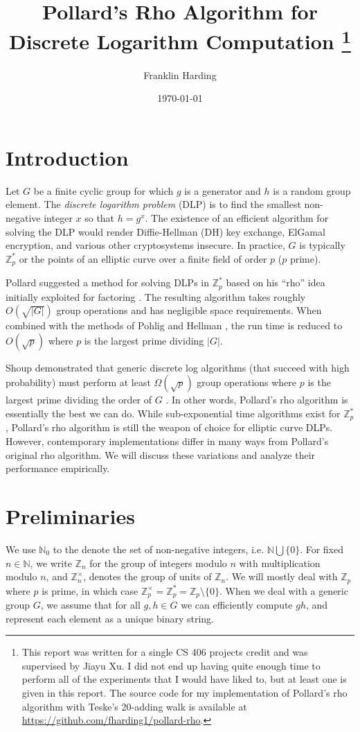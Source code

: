 \documentclass{article}
\title{Pollard's Rho Algorithm for Discrete Logarithm Computation \thanks{This report was written for a single CS 406 projects credit and was supervised by Jiayu Xu. I did not end up having quite enough time to perform all of the experiments that I would have liked to, but at least one is given in this report. The source code for my implementation of Pollard's rho algorithm with Teske's 20-adding walk is available at \href{https://github.com/fharding1/pollard-rho}{https://github.com/fharding1/pollard-rho}.}}
\author{Franklin Harding}
\date{\today}
\newcommand{\ZZ}{\mathbb{Z}}
\newcommand{\NN}{\mathbb{N}}
\begin{document}
\maketitle

\section{Introduction}

Let $G$ be a finite cyclic group for which $g$ is a generator and $h$ is a random group element. The \textit{discrete logarithm problem} (DLP) is to find the smallest non-negative integer $x$ so that $h = g^x$. The existence of an efficient algorithm for solving the DLP would render Diffie-Hellman (DH) key exchange, ElGamal encryption, and various other cryptosystems insecure. In practice, $G$ is typically $\ZZ_p^*$ or the points of an elliptic curve over a finite field of order $p$ ($p$ prime).

Pollard suggested a method for solving DLPs in $\ZZ_p^*$ \cite{Pollard1978} based on his ``rho'' idea initially exploited for factoring \cite{Pollard1975}. The resulting algorithm takes roughly $O(\sqrt{|G|})$ group operations and has negligible space requirements. When combined with the methods of Pohlig and Hellman \cite{Pohlig78}, the run time is reduced to $O(\sqrt{p})$ where $p$ is the largest prime dividing $|G|$.

Shoup demonstrated that generic discrete log algorithms (that succeed with high probability) must perform at least $\Omega(\sqrt{p})$ group operations where $p$ is the largest prime dividing the order of $G$ \cite{Shoup1997}. In other words, Pollard's rho algorithm is essentially the best we can do. While sub-exponential time algorithms exist for $\ZZ_p^*$, Pollard's rho algorithm is still the weapon of choice for elliptic curve DLPs. However, contemporary implementations differ in many ways from Pollard's original rho algorithm. We will discuss these variations and analyze their performance empirically.

\section{Preliminaries}

We use $\NN_0$ to the denote the set of non-negative integers, i.e. $\NN \bigcup \{0\}$. For fixed $n \in \NN$, we write $\ZZ_n$ for the group of integers modulo $n$ with multiplication modulo $n$, and $\ZZ_n^{\times}$, denotes the group of units of $\ZZ_n$. We will mostly deal with $\ZZ_p$ where $p$ is prime, in which case $\ZZ_p^{\times}=\ZZ_p^*=\ZZ_p \setminus \{0\}$. When we deal with a generic group $G$, we assume that for all $g,h \in G$ we can efficiently compute $gh$, and represent each element as a unique binary string.
\end{document}
